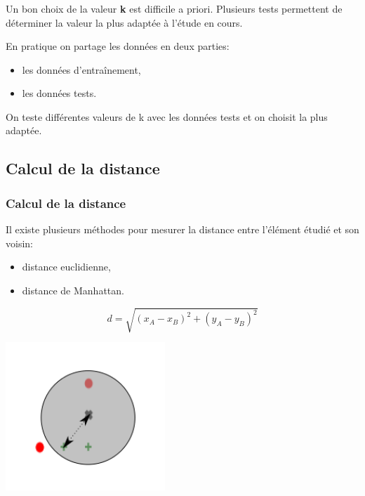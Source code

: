 \documentclass[svgnames,11pt]{beamer}
\begin{document}
\begin{frame}
    \frametitle{}

    \begin{aretenir}[]
        Un bon choix de la valeur \textbf{k} est difficile a priori. Plusieurs tests permettent de déterminer la valeur la plus adaptée à l'étude en cours.
    \end{aretenir}
    \begin{aretenir}[Remarque]
        En pratique on partage les données en deux parties:
        \begin{itemize}
            \item les données d'entraînement,
            \item les données tests.
        \end{itemize}
        On teste différentes valeurs de k avec les données tests et on choisit la plus adaptée.
    \end{aretenir}
\end{frame}

\subsection{Calcul de la distance}
\begin{frame}
    \frametitle{Calcul de la distance}

    \begin{aretenir}[]
        Il existe plusieurs méthodes pour mesurer la distance entre l'élément étudié et son voisin:
        \begin{itemize}
            \item distance euclidienne,
            \item distance de Manhattan.
        \end{itemize}
    \end{aretenir}

\end{frame}
\begin{frame}
    $$d=\sqrt{(x_A-x_B)^2+(y_A-y_B)^2}$$
    \begin{center}
        \centering
        \includegraphics[width=6cm]{ressources/euclidienne.png}
        \label{IMG}
    \end{center}
\end{frame}
\end{document}
